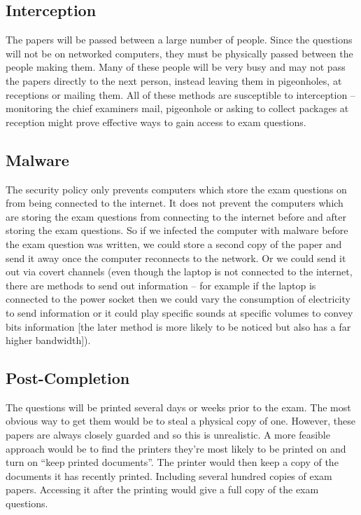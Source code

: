\documentclass[10pt,\jkfside,a4paper]{article}
\begin{document}
\begin{enumerate}
\begin{enumerate}
\begin{enumerate}[label=(\roman*)]
\subsection*{Interception}

The papers will be passed between a large number of people. Since the questions will
not be on networked computers, they must be physically passed between the people
making them. Many of these people will be very busy and may not pass the papers directly to
the next person, instead leaving them in pigeonholes, at receptions or mailing them.
All of these methods are susceptible to interception -- monitoring the chief examiners
mail, pigeonhole or asking to collect packages at reception might prove
effective ways to gain access to exam questions.

\subsection*{Malware}

The security policy only prevents computers which store the exam questions on
from being connected to the internet. It does not prevent the computers which are
storing the exam questions from connecting to the internet before and after storing
the exam questions. So if we infected the computer with malware before the exam question
was written, we could store a second copy of the paper and send it away once the computer
reconnects to the network. Or we could send it out via covert channels (even though the laptop
is not connected to the internet, there are methods to send out information -- for example
if the laptop is connected to the power socket then we could vary the consumption of
electricity to send information or it could play specific sounds at specific volumes to
convey bits information [the later method is more likely to be noticed but also has a
far higher bandwidth]).

\subsection*{Post-Completion}

The questions will be printed several days or weeks prior to the exam. The most obvious way
to get them would be to steal a physical copy of one. However, these papers are always
closely guarded and so this is unrealistic. A more feasible approach would be to find
the printers they're most likely to be printed on and turn on ``keep printed documents''.
The printer would then keep a copy of the documents it has recently printed. Including
several hundred copies of exam papers. Accessing it after the printing would give a
full copy of the exam questions.


\end{enumerate}
\end{enumerate}
\end{enumerate}
\end{document}
